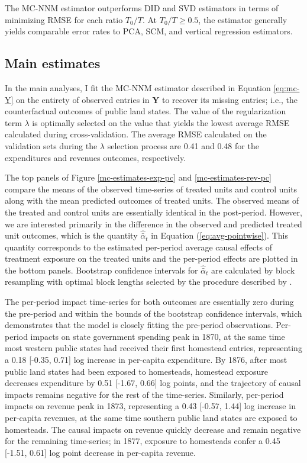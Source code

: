 \documentclass[12pt]{article}
\begin{document}
The MC-NNM estimator outperforms DID and SVD estimators in terms of minimizing RMSE for each ratio $T_0/T$. At $T_0/T \geq 0.5$, the estimator generally yields comparable error rates to PCA, SCM, and vertical regression estimators. 

\subsection{Main estimates}

In the main analyses, I fit the MC-NNM estimator described in Equation \ref{eq:mc-Y} on the entirety of observed entries in $\mathbf{Y}$ to recover its missing entries; i.e., the counterfactual outcomes of public land states. The value of the regularization term $\lambda$ is optimally selected on the value that yields the lowest average RMSE calculated during cross-validation. The average RMSE calculated on the validation sets during the $\lambda$ selection process are 0.41 and 0.48 for the expenditures and revenues outcomes, respectively. 

The top panels of Figure \ref{mc-estimates-exp-pc} and \ref{mc-estimates-rev-pc} compare the means of the observed time-series of treated units and control units along with the mean predicted outcomes of treated units. The observed means of the treated and control units are essentially identical in the post-period. However, we are interested primarily in the difference in the observed and predicted treated unit outcomes, which is the quantity $\hat{\bar{\alpha}}_{t}$ in Equation (\ref{eq:avg-pointwise}). This quantity corresponds to the estimated per-period average causal effects of treatment exposure on the treated units and the per-period effects are plotted in the bottom panels. Bootstrap confidence intervals for $\hat{\bar{\alpha}}_{t}$ are calculated by block resampling with optimal block lengths selected by the procedure described by \citet{politis2004automatic}. 

The per-period impact time-series for both outcomes are essentially zero during the pre-period and within the bounds of the bootstrap confidence intervals, which demonstrates that the model is closely fitting the pre-period observations. Per-period impacts on state government spending peak in 1870, at the same time most western public states had received their first homestead entries, representing a 0.18 [-0.35, 0.71] log increase in per-capita expenditure. By 1876, after most public land states had been exposed to homesteads, homestead exposure decreases expenditure by 0.51 [-1.67, 0.66] log points, and the trajectory of causal impacts remains negative for the rest of the time-series. Similarly, per-period impacts on revenue peak in 1873, representing a 0.43 [-0.57, 1.44] log increase in per-capita revenues, at the same time southern public land states are exposed to homesteads. The causal impacts on revenue quickly decrease and remain negative for the remaining time-series; in 1877, exposure to homesteads confer a 0.45 [-1.51, 0.61] log point decrease in per-capita revenue. 
\end{document}
